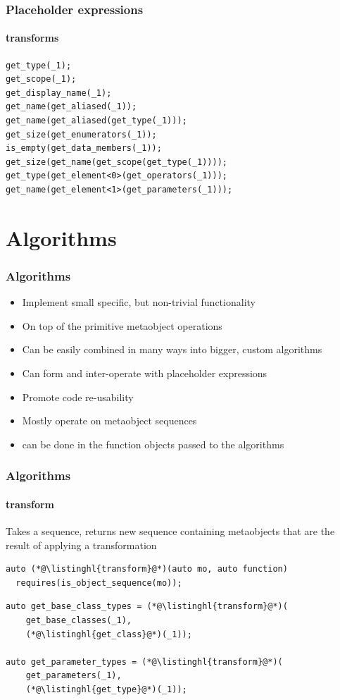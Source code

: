 \documentclass[compress,table,xcolor=table]{beamer}
\begin{document}
\begin{frame}[fragile]
  \frametitle{Placeholder expressions}
  \framesubtitle{transforms}
  \begin{lstlisting}[language=c++2x,basicstyle=\small\ttfamily]
get_type(_1);
get_scope(_1);
get_display_name(_1);
get_name(get_aliased(_1));
get_name(get_aliased(get_type(_1)));
get_size(get_enumerators(_1));
is_empty(get_data_members(_1));
get_size(get_name(get_scope(get_type(_1))));
get_type(get_element<0>(get_operators(_1)));
get_name(get_element<1>(get_parameters(_1)));
  \end{lstlisting}
\end{frame}
\section{Algorithms}
\begin{frame}
  \frametitle{Algorithms}
  \larger
  \begin{itemize}
    \item Implement small specific, but non-trivial functionality
    \item On top of the primitive metaobject operations
    \item Can be easily combined in many ways into bigger, custom algorithms
    \item Can form and inter-operate with placeholder expressions
    \item Promote code re-usability
    \item Mostly operate on metaobject sequences
    \item {} can be done in the function objects passed
      to the algorithms
  \end{itemize}
\end{frame}
\begin{frame}[fragile]
  \frametitle{Algorithms}
  \framesubtitle{transform}
  Takes a sequence, returns new sequence containing metaobjects that are
  the result of applying a transformation 
  \begin{lstlisting}[language=c++2x]
auto (*@\listinghl{transform}@*)(auto mo, auto function)
  requires(is_object_sequence(mo));
  \end{lstlisting}
  \vfill
  \begin{lstlisting}[language=c++2x,basicstyle=\footnotesize\ttfamily]
auto get_base_class_types = (*@\listinghl{transform}@*)(
    get_base_classes(_1),
    (*@\listinghl{get_class}@*)(_1));

auto get_parameter_types = (*@\listinghl{transform}@*)(
    get_parameters(_1),
    (*@\listinghl{get_type}@*)(_1));
  \end{lstlisting}
\end{frame}
\end{document}
